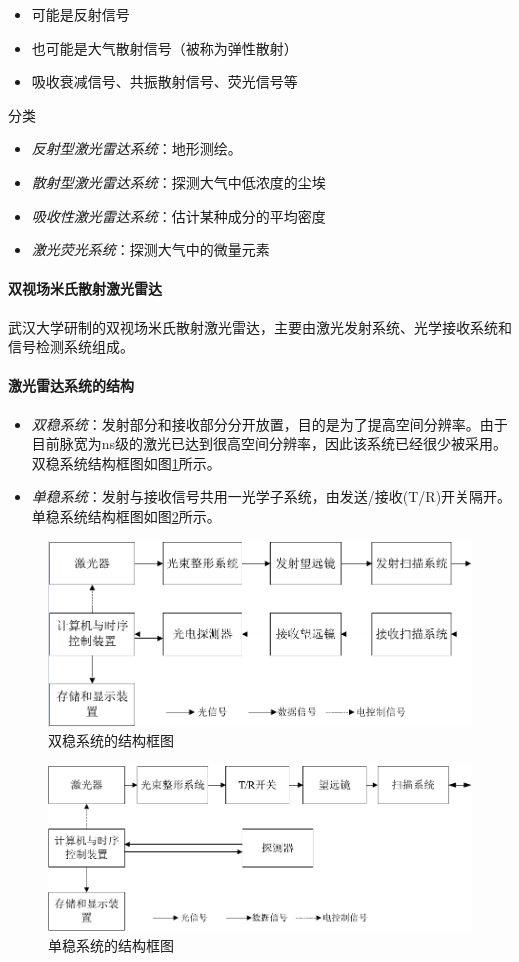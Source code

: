 \begin{enumerate}
{{\begin{itemize}
			\item 可能是反射信号
			\item 也可能是大气散射信号（被称为弹性散射）
			\item 吸收衰减信号、共振散射信号、荧光信号等
	\end{itemize}}分类}
		\begin{itemize}
			\item \textit{反射型激光雷达系统}：地形测绘。
			\item \textit{散射型激光雷达系统}：探测大气中低浓度的尘埃
			\item \textit{吸收性激光雷达系统}：估计某种成分的平均密度
			\item \textit{激光荧光系统}：探测大气中的微量元素
		\end{itemize}
\end{enumerate} %

\paragraph{双视场米氏散射激光雷达}武汉大学研制的双视场米氏散射激光雷达，主要由激光发射系统、光学接收系统和信号检测系统组成。

\paragraph{激光雷达系统的结构} 
\begin{itemize}
	\item \textit{双稳系统}：发射部分和接收部分分开放置，目的是为了提高空间分辨率。由于目前脉宽为ns级的激光已达到很高空间分辨率，因此该系统已经很少被采用。双稳系统结构框图如图\ref{fig:双稳系统的结构框图}所示。
	\item \textit{单稳系统}：发射与接收信号共用一光学子系统，由发送/接收(T/R)开关隔开。单稳系统结构框图如图\ref{fig:单稳系统的结构框图}所示。
\end{itemize}
\begin{figure}[htbp]
	\centering
	\includegraphics[width=0.7\linewidth]{figure/Chapter2/双稳系统的结构框图}
	\caption{双稳系统的结构框图}
	\label{fig:双稳系统的结构框图}
\end{figure}
\begin{figure}[htbp]
	\centering
	\includegraphics[width=0.7\linewidth]{figure/Chapter2/单稳系统的结构框图}
	\caption{单稳系统的结构框图}
	\label{fig:单稳系统的结构框图}
\end{figure}

